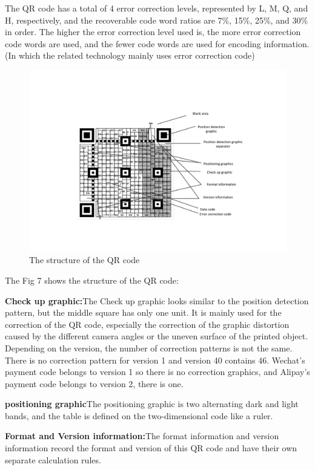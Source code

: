 \documentclass[journal]{IEEEtran}
\begin{document}
The QR code has a total of 4 error correction levels, represented by L, M, Q, and H, respectively, and the recoverable code word ratios are 7\%, 15\%, 25\%, and 30\% in order. The higher the error correction level used is, the more error correction code words are used, and the fewer code words are used for encoding information. (In which the related technology mainly uses error correction code)

\begin{figure}[htbp]
\centerline{\includegraphics[scale=0.46]{QRcode.pdf}}
\caption{The structure of the QR code}
\label{fig}
\end{figure}

The Fig 7 shows the structure of the QR code:

\textbf{Check up graphic:}The Check up graphic looks similar to the position detection pattern, but the middle square has only one unit. It is mainly used for the correction of the QR code, especially the correction of the graphic distortion caused by the different camera angles or the uneven surface of the printed object. Depending on the version, the number of correction patterns is not the same. There is no correction pattern for version 1 and version 40 contains 46. Wechat's payment code belongs to version 1 so there is no correction graphics, and Alipay's payment code belongs to version 2, there is one.

\textbf{positioning graphic}The positioning graphic is two alternating dark and light bands, and the table is defined on the two-dimensional code like a ruler.

\textbf{Format and Version information:}The format information and version information record the format and version of this QR code and have their own separate calculation rules.
\end{document}

